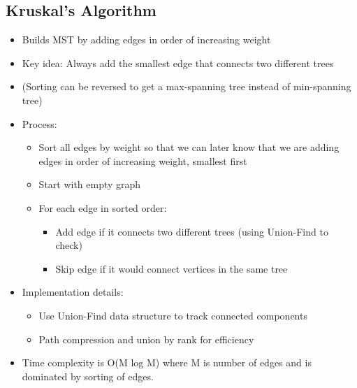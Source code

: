\documentclass[11pt,a4paper]{article}
\begin{document}
\begin{multicols}{2}
\subsection{Kruskal's Algorithm}
\begin{itemize}
    \item Builds MST by adding edges in order of increasing weight
    \item Key idea: Always add the smallest edge that connects two different trees
    \item (Sorting can be reversed to get a max-spanning tree instead of min-spanning tree)
    \item Process:
    \begin{itemize}
        \item Sort all edges by weight so that we can later know that we are adding edges in order of increasing weight, smallest first
        \item Start with empty graph
        \item For each edge in sorted order:
        \begin{itemize}
            \item Add edge if it connects two different trees (using Union-Find to check)
            \item Skip edge if it would connect vertices in the same tree
        \end{itemize}
    \end{itemize}
    \item Implementation details:
    \begin{itemize}
        \item Use Union-Find data structure to track connected components
        \item Path compression and union by rank for efficiency
    \end{itemize}

    \item Time complexity is O(M log M) where M is number of edges and is dominated by sorting of edges.


\end{itemize}
\end{multicols}
\end{document}
